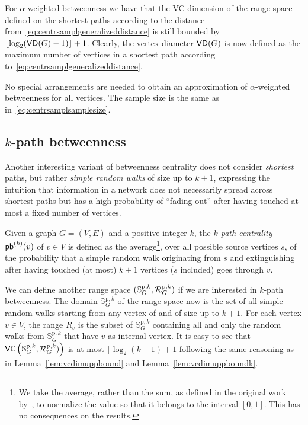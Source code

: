 For $\alpha$-weighted betweenness we have that the VC-dimension of the range space
defined on the shortest paths according to the distance
from~\eqref{eq:centrsamplgeneralizeddistance} is still bounded by
$\lfloor\log_2(\mathsf{VD}(G)-1)\rfloor+1$. Clearly, the vertex-diameter $\mathsf{VD}(G)$ is now
defined as the maximum number of vertices in a shortest path according
to~\eqref{eq:centrsamplgeneralizeddistance}.

No special arrangements are needed to obtain an approximation of
$\alpha$-weighted betweenness for all vertices. The sample size is the same as in~\eqref{eq:centrsamplsamplesize}.

\subsection{$k$-path betweenness}
Another interesting variant of betweenness centrality does not consider
\emph{shortest} paths, but rather \emph{simple random walks} of size up to
$k+1$, expressing the intuition that information in a network does not
necessarily spread across shortest paths but has a high probability of ``fading
out'' after having touched at most a fixed number of vertices.

\begin{definition}\label{def:centrsamplkpathbetweenness}
 Given a graph $G=(V,E)$ and a positive integer $k$, the \emph{$k$-path
 centrality} $\mathsf{pb}^{(k)}(v)$ of $v\in V$ is defined as the average\footnote{We take the
 average, rather than the sum, as defined in the original work
 by~\citet{KourtellisASIT12}, to normalize the value so that it belongs to the interval
 $[0,1]$. This has no consequences on the results.}, over all possible source
 vertices $s$, of the probability that a simple random walk originating from
 $s$ and extinguishing after having touched (at most) $k+1$ vertices ($s$
 included) goes through $v$.
\end{definition}

We can define another range space
$(\mathbb{S}^{\mathrm{p},k}_G,\mathcal{R}_G^{\mathrm{p},k})$ if we are interested in
$k$-path betweenness. The domain $\mathbb{S}^{\mathrm{p},k}_G$ of the range
space now is the set of all simple random walks starting from any vertex of and
of size up to $k+1$. For each vertex $v\in V$, the range $R_v$ is the subset of
$\mathbb{S}^{\mathrm{p},k}_G$ containing all and only the random walks from
$\mathbb{S}^{\mathrm{p},k}_G$ that have $v$ as internal vertex. It is easy to
see that $\mathsf{VC}\left(\mathbb{S}^{\mathrm{p},k}_G,\mathcal{R}_G^{\mathrm{p},k})\right)$
is at most $\lfloor\log_2(k-1)+1$ following the same reasoning as in
Lemma~\ref{lem:vcdimuppbound} and Lemma~\ref{lem:vcdimuppboundk}.

